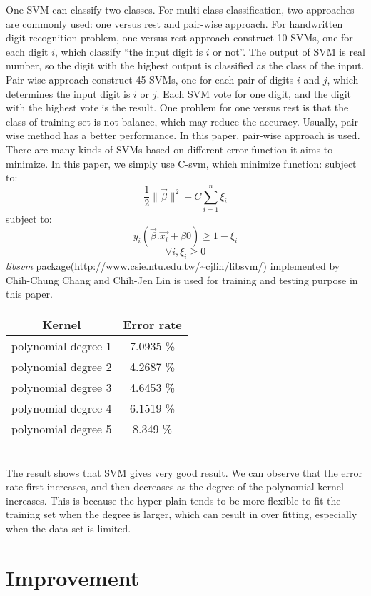 \documentclass[a4paper,11pt]{article}
\begin{document}
One SVM can classify two classes. For multi class classification, two approaches are commonly used: one versus rest and pair-wise approach. For handwritten digit recognition problem, one versus rest approach construct 10 SVMs, one for each digit $i$, which classify ``the input digit is $i$ or not''.  The output of SVM is real number, so the digit with the highest output is classified as the class of the input. Pair-wise approach construct 45 SVMs, one for each pair of digits $i$ and $j$, which determines the input digit is $i$ or $j$. Each SVM vote for one digit, and the digit with the highest vote is the result. One problem for one versus rest is that the class of training set is not balance, which may reduce the accuracy. Usually, pair-wise method has a better performance. In this paper, pair-wise approach is used.\\
There are many kinds of SVMs based on different error function it aims to minimize. In this paper, we simply use C-svm, which minimize function:
 subject to:$$\frac{1}{2}\|\vec{\beta}\|^2+C\sum_{i=1}^n \xi_i$$
 subject to:$$y_i(\vec{\beta}.\vec{x_i}+\beta{0})\geq 1-\xi_i$$$$\forall i, \xi_i\geq 0$$
\emph{libsvm} package(\url{http://www.csie.ntu.edu.tw/~cjlin/libsvm/}) implemented by Chih-Chung Chang and Chih-Jen Lin is used for training and testing purpose in this paper.

\vspace{0.5cm}
\begin{tabular}{c c}
Kernel		&	Error rate\\
\hline \hline
polynomial degree 1	&7.0935 \%\\
polynomial degree 2	&4.2687 \%\\
polynomial degree 3	&4.6453 \%\\
polynomial degree 4	&6.1519 \%\\
polynomial degree 5	&8.349  \%\\
\end{tabular}
\vspace{0.5cm}\\
The result shows that SVM gives very good result. We can observe that the error rate first increases, and then decreases as the degree of the polynomial kernel increases. This is because the hyper plain tends to be more flexible to fit the training set when the degree is larger, which can result in over fitting, especially when the data set is limited.

\section{Improvement}
\end{document}
